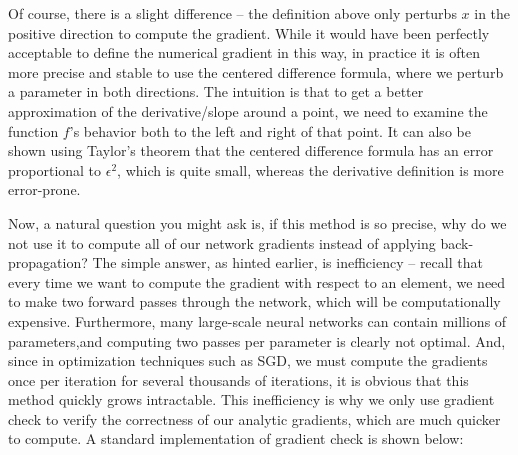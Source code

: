 \documentclass{tufte-handout}
\begin{document}
Of course, there is a slight difference -- the definition above only perturbs $x$ in the positive direction to compute the gradient. While it would have been perfectly acceptable to define the numerical gradient in this way, in practice it is often more precise and stable to use the {centered difference formula}, where we perturb a parameter in both directions. The intuition is that to get a better approximation of the derivative/slope around a point, we need to examine the function $f$'s behavior both to the left and right of that point. It can also be shown using Taylor's theorem that the centered difference formula has an error proportional to $\epsilon^2$, which is quite small, whereas the derivative definition is more error-prone.

Now, a natural question you might ask is, if this method is so precise, why do we not use it to compute all of our network gradients instead of applying back-propagation? The simple answer, as hinted earlier, is inefficiency -- recall that every time we want to compute the gradient with respect to an element, we need to make two forward passes through the network, which will be computationally expensive. Furthermore, many large-scale neural networks can contain millions of parameters,and computing two passes per parameter is clearly not optimal. And, since in optimization techniques such as SGD, we must compute the gradients once per iteration for several thousands of iterations, it is obvious that this method quickly grows intractable. This inefficiency is why we only use gradient check to verify the correctness of our analytic gradients, which are much quicker to compute. A standard implementation of gradient check is shown below:
\end{document}
